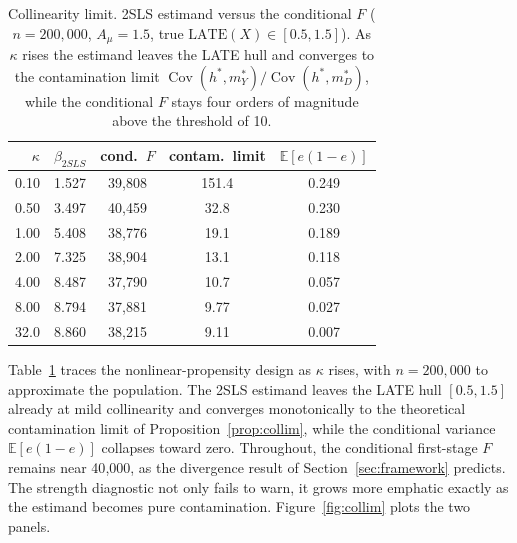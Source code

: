 \documentclass[11pt]{article}
\theoremstyle{plain}
\theoremstyle{definition}
\newcommand{\E}{\mathbb{E}}
\newcommand{\Cov}{\operatorname{Cov}}
\begin{document}
\begin{table}[t]
\centering
\caption{Collinearity limit. 2SLS estimand versus the conditional $F$ ($n=200{,}000$, $A_\mu=1.5$, true $\mathrm{LATE}(X)\in[0.5,1.5]$). As $\kappa$ rises the estimand leaves the LATE hull and converges to the contamination limit $\Cov(h^\ast,m_Y^\ast)/\Cov(h^\ast,m_D^\ast)$, while the conditional $F$ stays four orders of magnitude above the threshold of 10.}
\label{tab:collim}
\begin{tabular}{rcccc}
\toprule
$\kappa$ & $\beta_{2SLS}$ & cond.\ $F$ & contam.\ limit & $\E[e(1-e)]$\\
\midrule
0.10 & 1.527 & 39{,}808 & 151.4 & 0.249\\
0.50 & 3.497 & 40{,}459 & 32.8 & 0.230\\
1.00 & 5.408 & 38{,}776 & 19.1 & 0.189\\
2.00 & 7.325 & 38{,}904 & 13.1 & 0.118\\
4.00 & 8.487 & 37{,}790 & 10.7 & 0.057\\
8.00 & 8.794 & 37{,}881 & 9.77 & 0.027\\
32.0 & 8.860 & 38{,}215 & 9.11 & 0.007\\
\bottomrule
\end{tabular}
\end{table}

Table~\ref{tab:collim} traces the nonlinear-propensity design as $\kappa$ rises, with $n=200{,}000$ to approximate the population. The 2SLS estimand leaves the LATE hull $[0.5,1.5]$ already at mild collinearity and converges monotonically to the theoretical contamination limit of Proposition~\ref{prop:collim}, while the conditional variance $\E[e(1-e)]$ collapses toward zero. Throughout, the conditional first-stage $F$ remains near 40{,}000, as the divergence result of Section~\ref{sec:framework} predicts. The strength diagnostic not only fails to warn, it grows more emphatic exactly as the estimand becomes pure contamination. Figure~\ref{fig:collim} plots the two panels.
\end{document}
